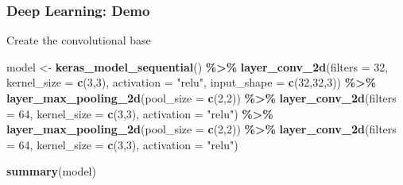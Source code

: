 \documentclass[
  shownotes,
  xcolor={svgnames},
  hyperref={colorlinks,citecolor=DarkBlue,linkcolor=DarkRed,urlcolor=DarkBlue}
  , aspectratio=169]{beamer}
\newenvironment{Shaded}{\begin{snugshade}}{\end{snugshade}}
\newcommand{\DataTypeTok}[1]{\textcolor[rgb]{0.13,0.29,0.53}{#1}}
\newcommand{\DecValTok}[1]{\textcolor[rgb]{0.00,0.00,0.81}{#1}}
\newcommand{\KeywordTok}[1]{\textcolor[rgb]{0.13,0.29,0.53}{\textbf{#1}}}
\newcommand{\NormalTok}[1]{#1}
\newcommand{\OperatorTok}[1]{\textcolor[rgb]{0.81,0.36,0.00}{\textbf{#1}}}
\newcommand{\StringTok}[1]{\textcolor[rgb]{0.31,0.60,0.02}{#1}}
\begin{document}
\begin{frame}[fragile]
\frametitle{Deep Learning: Demo}

Create the convolutional base
\begin{scriptsize}


\begin{Shaded}
\begin{Highlighting}[]
\NormalTok{model \textless{}{-}}\StringTok{ }\KeywordTok{keras\_model\_sequential}\NormalTok{() }\OperatorTok{\%\textgreater{}\%}\StringTok{ }
\StringTok{  }\KeywordTok{layer\_conv\_2d}\NormalTok{(}\DataTypeTok{filters =} \DecValTok{32}\NormalTok{, }\DataTypeTok{kernel\_size =} \KeywordTok{c}\NormalTok{(}\DecValTok{3}\NormalTok{,}\DecValTok{3}\NormalTok{), }\DataTypeTok{activation =} \StringTok{"relu"}\NormalTok{, }
                \DataTypeTok{input\_shape =} \KeywordTok{c}\NormalTok{(}\DecValTok{32}\NormalTok{,}\DecValTok{32}\NormalTok{,}\DecValTok{3}\NormalTok{)) }\OperatorTok{\%\textgreater{}\%}\StringTok{ }
\StringTok{  }\KeywordTok{layer\_max\_pooling\_2d}\NormalTok{(}\DataTypeTok{pool\_size =} \KeywordTok{c}\NormalTok{(}\DecValTok{2}\NormalTok{,}\DecValTok{2}\NormalTok{)) }\OperatorTok{\%\textgreater{}\%}\StringTok{ }
\StringTok{  }\KeywordTok{layer\_conv\_2d}\NormalTok{(}\DataTypeTok{filters =} \DecValTok{64}\NormalTok{, }\DataTypeTok{kernel\_size =} \KeywordTok{c}\NormalTok{(}\DecValTok{3}\NormalTok{,}\DecValTok{3}\NormalTok{), }\DataTypeTok{activation =} \StringTok{"relu"}\NormalTok{) }\OperatorTok{\%\textgreater{}\%}\StringTok{ }
\StringTok{  }\KeywordTok{layer\_max\_pooling\_2d}\NormalTok{(}\DataTypeTok{pool\_size =} \KeywordTok{c}\NormalTok{(}\DecValTok{2}\NormalTok{,}\DecValTok{2}\NormalTok{)) }\OperatorTok{\%\textgreater{}\%}\StringTok{ }
\StringTok{  }\KeywordTok{layer\_conv\_2d}\NormalTok{(}\DataTypeTok{filters =} \DecValTok{64}\NormalTok{, }\DataTypeTok{kernel\_size =} \KeywordTok{c}\NormalTok{(}\DecValTok{3}\NormalTok{,}\DecValTok{3}\NormalTok{), }\DataTypeTok{activation =} \StringTok{"relu"}\NormalTok{)}
\end{Highlighting}
\end{Shaded}

\begin{Shaded}
\begin{Highlighting}[]
\KeywordTok{summary}\NormalTok{(model)}
\end{Highlighting}
\end{Shaded}
\end{scriptsize}

\end{frame}
\end{document}
